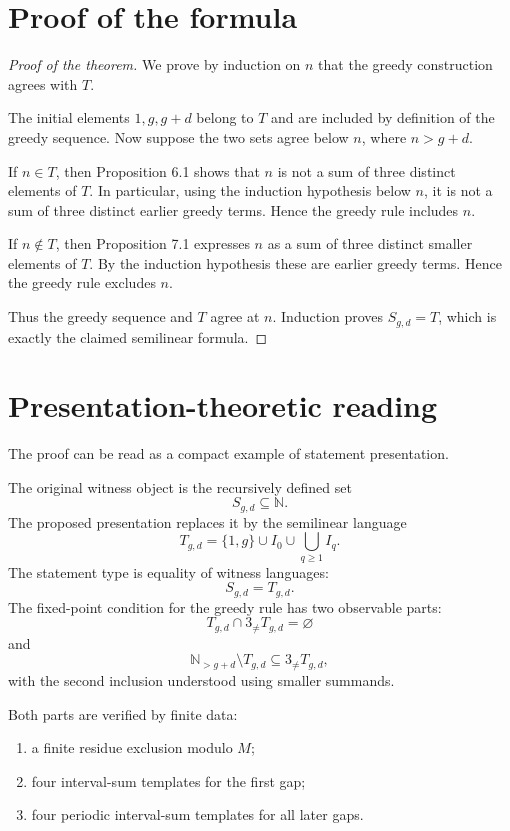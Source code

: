 \documentclass[11pt]{article}
\begin{document}
\section{Proof of the formula}

\begin{proof}[Proof of the theorem]
We prove by induction on \(n\) that the greedy construction agrees with \(T\).

The initial elements \(1,g,g+d\) belong to \(T\) and are included by definition of the greedy sequence. Now suppose the two sets agree below \(n\), where \(n>g+d\).

If \(n\in T\), then Proposition 6.1 shows that \(n\) is not a sum of three distinct elements of \(T\). In particular, using the induction hypothesis below \(n\), it is not a sum of three distinct earlier greedy terms. Hence the greedy rule includes \(n\).

If \(n\notin T\), then Proposition 7.1 expresses \(n\) as a sum of three distinct smaller elements of \(T\). By the induction hypothesis these are earlier greedy terms. Hence the greedy rule excludes \(n\).

Thus the greedy sequence and \(T\) agree at \(n\). Induction proves \(S_{g,d}=T\), which is exactly the claimed semilinear formula.
\end{proof}

\section{Presentation-theoretic reading}

The proof can be read as a compact example of statement presentation.

The original witness object is the recursively defined set
\[
S_{g,d}\subseteq\mathbb N.
\]
The proposed presentation replaces it by the semilinear language
\[
T_{g,d}
=\{1,g\}\cup I_0\cup\bigcup_{q\geq1}I_q.
\]
The statement type is equality of witness languages:
\[
S_{g,d}=T_{g,d}.
\]
The fixed-point condition for the greedy rule has two observable parts:
\[
T_{g,d}\cap 3_{\neq}T_{g,d}=\varnothing
\]
and
\[
\mathbb N_{>g+d}\setminus T_{g,d}
\subseteq
3_{\neq}T_{g,d},
\]
with the second inclusion understood using smaller summands.

Both parts are verified by finite data:
\begin{enumerate}[label=\textup{(\roman*)}]
\item a finite residue exclusion modulo \(M\);
\item four interval-sum templates for the first gap;
\item four periodic interval-sum templates for all later gaps.
\end{enumerate}
\end{document}
